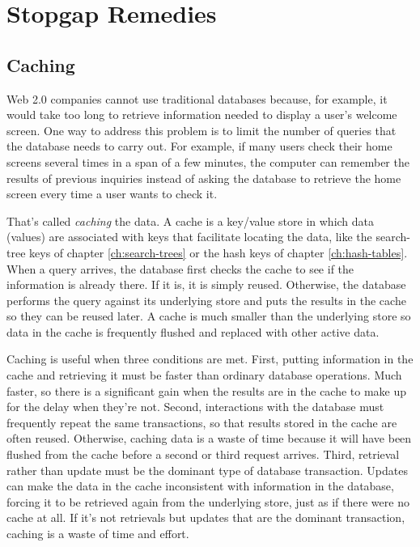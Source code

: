 \section{Stopgap Remedies}

\subsection{Caching}

Web 2.0 companies cannot use traditional databases
because, for example, it would take too long to retrieve information needed
to display a user's welcome screen.
One way to address this problem is to limit the number of queries that the
database needs to carry out.
For example, if many users check their home screens
several times in a span of a few minutes,
the computer can remember the results of previous inquiries
instead of asking the database to
retrieve the home screen every time a user wants to check it.

That's called \emph{caching} the data.
A cache is a key/value store
in which data (values) are associated with keys
that facilitate locating the data,
like the search-tree keys of chapter \ref{ch:search-trees}
or the hash keys of chapter \ref{ch:hash-tables}.
When a query arrives, the database first checks
the cache to see if the information is already there.
If it is, it is simply reused.
Otherwise, the database performs the query against its underlying store
and puts the results in the cache so they can be reused later.
A cache is much smaller than the underlying store
so data in the cache is frequently flushed and replaced with other active data.

Caching is useful when three conditions are met.
First, putting information in the cache and retrieving it
must be faster than ordinary database operations.
Much faster, so there is a significant gain
when the results are in the cache to make up for the delay when they're not.
Second, interactions with the database must frequently repeat the same transactions,
so that results stored in the cache are often reused.
Otherwise, caching data is a waste of time because it will
have been flushed from the cache before a second or third request arrives.
Third, retrieval
rather than update must be the dominant type of database transaction.
Updates can make the data in the cache inconsistent with information in the database,
forcing it to be retrieved again from the underlying store,
just as if there were no cache at all.
If it's not retrievals but updates that are the dominant transaction,
caching is a waste of time and effort.

